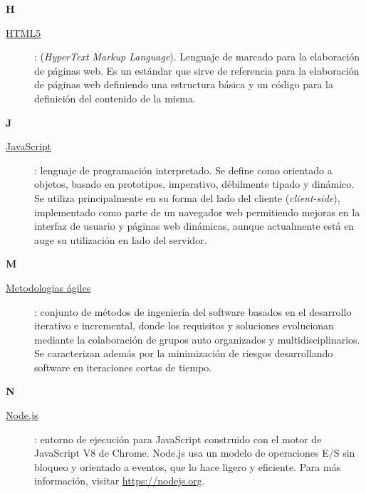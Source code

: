 \bigskip
{\bfseries {\Huge H}}\label{Apendice1:H}
\bigskip
\bigskip

\begin{description}
  \item[\underline{HTML5}\label{apend1:html}]: (\textit{HyperText Markup Language}). Lenguaje de marcado para la elaboración de páginas web. Es un estándar que sirve de referencia para la elaboración de páginas web definiendo una estructura básica y un código para la definición del contenido de la misma.
  \bigskip
\end{description}

\bigskip
\newpage

{\bfseries {\Huge J}}\label{Apendice1:J}
\bigskip
\bigskip

\begin{description}
  \item[\underline{JavaScript}\label{apend1:js}]: lenguaje de programación interpretado. Se define como orientado a objetos, basado en prototipos, imperativo, débilmente tipado y dinámico. Se utiliza principalmente en su forma del lado del cliente (\textit{client-side}), implementado como parte de un navegador web permitiendo mejoras en la interfaz de usuario y páginas web dinámicas, aunque actualmente está en auge su utilización en lado del servidor. 
  \bigskip
\end{description}

\bigskip
{\bfseries {\Huge M}}\label{Apendice1:M}
\bigskip
\bigskip

\begin{description}
  \item[\underline{Metodologias \'agiles}\label{apend1:ma}]: conjunto de métodos de ingeniería del software basados en el desarrollo iterativo e incremental, donde los requisitos y soluciones evolucionan mediante la colaboración de grupos auto organizados y multidisciplinarios. Se caracterizan además por la minimización de riesgos desarrollando software en iteraciones cortas de tiempo.
  \bigskip
\end{description}

\bigskip
{\bfseries {\Huge N}}\label{Apendice1:N}
\bigskip
\bigskip

\begin{description}
  \item[\underline{Node.js}\label{apend1:node}]: entorno de ejecución para JavaScript construido con el motor de JavaScript V8 de Chrome. Node.js usa un modelo de operaciones E/S sin bloqueo y orientado a eventos, que lo hace ligero y eficiente. Para más información, visitar {\small \url{https://nodejs.org}}.
  \bigskip
\end{description}

